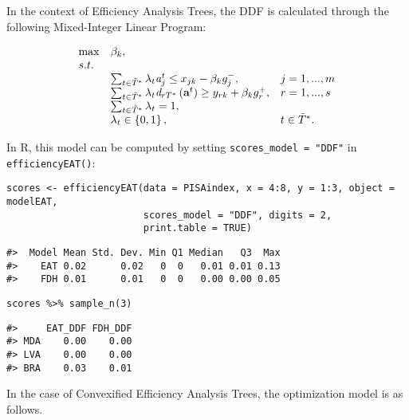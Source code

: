 In the context of Efficiency Analysis Trees, the DDF is calculated through the following Mixed-Integer Linear Program:

\begin{equation} \label{(29)} 
\begin{array}{lllll} 
{} & {\max } & {\beta_{k}, } & {} & {} \\ 
{} & {s.t.} & {} & {} & {} \\ 
{} & {} & {\sum_{t\in \tilde{T}^{*}}^{}\lambda_{t}{\it a}_{j}^{t}  \le x_{jk} -\beta_{k} g_{j}^{-} ,} & {j=1,...,m} & {} \\ 
{} & {} & {\sum_{t\in \tilde{T}^{*}}^{}\lambda_{t}{\it d}_{rT^{*}} \left({\it \textbf{a}}^{t} \right) \ge y_{rk} +\beta_{k} g_{r}^{+} ,} & {r=1,...,s} & {} \\ 
{} & {} & {\sum_{t\in \tilde{T}^{*}}^{}\lambda_{t}=1,} & {} & {} \\ 
{} & {} & {\lambda _{t} \in \left\{0,1\right\},} & {t\in \tilde{T}^{*}. } & {} 
\end{array} 
\end{equation}

In R, this model can be computed by setting \texttt{scores\_model\ =\ "DDF"} in \texttt{efficiencyEAT()}:

\begin{verbatim}
scores <- efficiencyEAT(data = PISAindex, x = 4:8, y = 1:3, object = modelEAT, 
                        scores_model = "DDF", digits = 2, 
                        print.table = TRUE)
\end{verbatim}

\begin{verbatim}
#>  Model Mean Std. Dev. Min Q1 Median   Q3  Max
#>    EAT 0.02      0.02   0  0   0.01 0.01 0.13
#>    FDH 0.01      0.01   0  0   0.00 0.00 0.05
\end{verbatim}

\begin{verbatim}
scores %>% sample_n(3)
\end{verbatim}

\begin{verbatim}
#>     EAT_DDF FDH_DDF
#> MDA    0.00    0.00
#> LVA    0.00    0.00
#> BRA    0.03    0.01
\end{verbatim}

In the case of Convexified Efficiency Analysis Trees, the optimization model is as follows.

